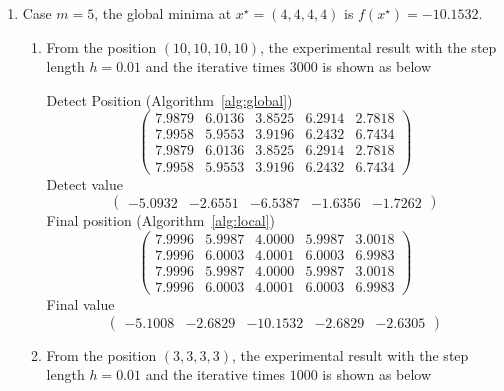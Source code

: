 \documentclass[11pt,fceqn]{article}
\numberwithin{equation}{section}
\theoremstyle{definition}
\begin{document}
\begin{enumerate}[label=\textbf{(\arabic*)}]
\item Case $m=5$, the global minima at $x^{\star} = (4,4,4,4)$ is $f(x^{\star}) = - 10.1532$.
\begin{enumerate}[label=\textbf{(\alph*)}]
\item From the position $(10,10,10,10)$, the experimental result with the step length $h=0.01$ and the iterative times $3000$ is shown as below

Detect Position (Algorithm~\ref{alg:global})
$$
\begin{pmatrix}
7.9879 & 6.0136 & 3.8525 & 6.2914 & 2.7818 \\
7.9958 & 5.9553 & 3.9196 & 6.2432 & 6.7434 \\
7.9879 & 6.0136 & 3.8525 & 6.2914 & 2.7818 \\
7.9958 & 5.9553 & 3.9196 & 6.2432 & 6.7434
\end{pmatrix}
$$
Detect value 
$$
\begin{pmatrix}
-5.0932 & -2.6551 & -6.5387 & -1.6356 & -1.7262
\end{pmatrix}
$$
Final position (Algorithm~\ref{alg:local}) 
$$
\begin{pmatrix}
7.9996 & 5.9987 & 4.0000 & 5.9987 & 3.0018 \\
7.9996 & 6.0003 & 4.0001 & 6.0003 & 6.9983 \\
7.9996 & 5.9987 & 4.0000 & 5.9987 & 3.0018 \\
7.9996 & 6.0003 & 4.0001 & 6.0003 & 6.9983
\end{pmatrix}
$$
Final value
$$
\begin{pmatrix}
-5.1008 & -2.6829 & -10.1532 & -2.6829 & -2.6305
\end{pmatrix}
$$
\item From the position $(3,3,3,3)$, the experimental result with the step length $h=0.01$ and the iterative times $1000$ is shown as below


\end{enumerate}
\end{enumerate}
\end{document}
